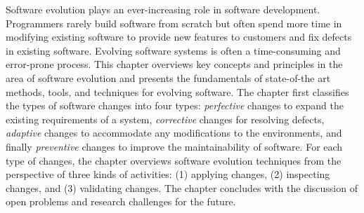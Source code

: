 	Software evolution plays an ever-increasing role in software development. Programmers rarely build software from scratch but often spend more time in modifying existing software to provide new features to customers and fix defects in existing software. Evolving software systems is often a time-consuming and error-prone process. This chapter overviews key concepts and principles in the area of software evolution and presents the fundamentals of state-of-the art methods, tools, and techniques for evolving software. The chapter first classifies the types of software changes into four types: {\em perfective} changes to expand the existing requirements of a system, {\em corrective} changes for resolving defects, {\em adaptive} changes to accommodate any modifications to the environments, and finally {\em preventive} changes to improve the maintainability of software. For each type of changes, the chapter overviews software evolution techniques from the perspective of three kinds of activities: (1) applying changes, (2) inspecting changes, and (3) validating changes. The chapter concludes with the discussion of open problems and research challenges for the future. 

